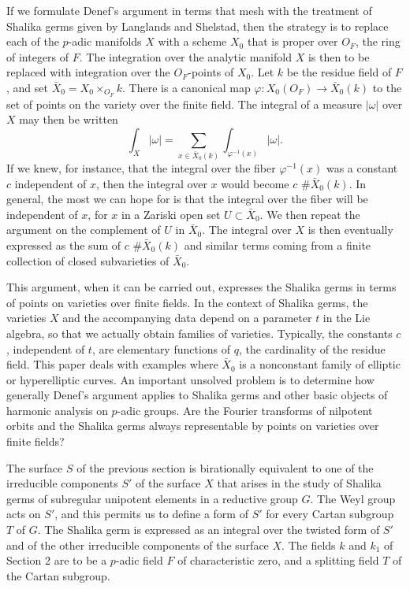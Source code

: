 If we formulate Denef's argument in terms that mesh with 
the treatment 
of Shalika germs given by Langlands and Shelstad, 
then the strategy
is to replace each of the $p$-adic
manifolds $X$ with a scheme $X_0$ that is proper over
$O_F$, the ring of integers of $F$.  The integration over the
analytic manifold $X$ is then to be replaced
 with integration over the $O_F$-points
of $X_0$.  Let $k$ be the residue field of $F$, and set
$\bar X_0 = X_0\times_{O_F} k$.  There is a canonical map
$\varphi:X_0(O_F) \to \bar X_0(k)$ to the set of points on the
variety over the finite field.  The integral of a measure $|\omega|$
over $X$ may then be written
$$\int_X |\omega| = \sum_{x\in \bar X_0(k)} \int_{\varphi^{-1}(x)} |\omega|.$$
If we knew, for instance, that the integral over the fiber $\varphi^{-1}(x)$
was a constant $c$ independent of $x$, then the integral over $x$
would 
become $c\,\, \#\bar X_0(k)$.  In general, the most we can hope for is that
the integral over the fiber will be independent of $x$,
 for $x$ in a 
Zariski open set $U\subset \bar X_0$. We then
repeat the argument on the complement of $U$ in $\bar X_0$.
 The integral over $X$ is 
then eventually expressed as 
the
sum of $c\,\,\#\bar X_0(k)$ and similar terms coming from a finite collection
of closed subvarieties of $\bar X_0$. 

This argument, when it can be carried out, expresses the Shalika
germs in terms of points on varieties over finite fields.  In the context
of Shalika germs, the varieties $X$ 
and the accompanying data depend on a parameter $t$ in the
Lie algebra, so that we actually obtain families of varieties.
Typically, the constants $c$, independent of $t$, are elementary
functions of $q$, the cardinality of the residue field.
This
paper deals with examples where $\bar X_0$ is a nonconstant
family of elliptic or hyperelliptic curves.
An important unsolved problem is to determine how
generally Denef's argument applies
to Shalika germs and other
basic objects of harmonic analysis on $p$-adic groups.
Are the Fourier transforms of nilpotent orbits and the Shalika germs
always representable by points on varieties over finite fields?

The surface $S$ of the previous section is birationally equivalent
to one of the irreducible components $S'$
of the surface $X$ that
arises in the study of Shalika germs of subregular unipotent elements
in a reductive group $G$.  The Weyl group acts on $S'$, and this permits
us to define a form of $S'$ for every Cartan subgroup $T$ of $G$.
The Shalika germ is expressed as an integral over the twisted form
of $S'$ and of the other irreducible components of the surface $X$.
The fields $k$ and $k_1$ of Section 2 are to be a $p$-adic field $F$
of characteristic zero, and a splitting field $T$ of the Cartan subgroup.


